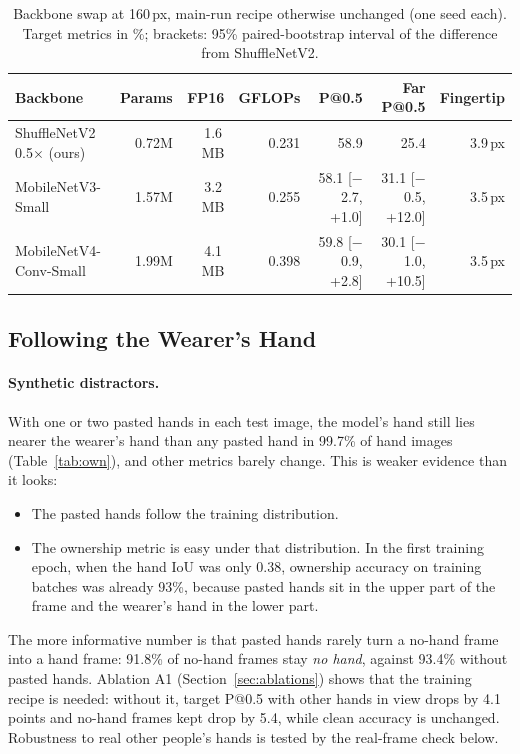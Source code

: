 \begin{table}[t]
  \caption{Backbone swap at 160\,px, main-run recipe otherwise unchanged (one seed each). Target metrics in \%; brackets: 95\% paired-bootstrap interval of the difference from ShuffleNetV2.}
  \label{tab:backbone}
  \footnotesize
  \setlength{\tabcolsep}{4pt}
  \begin{tabular}{lrrrrrr}
    \toprule
    Backbone & Params & FP16 & GFLOPs & P@0.5 & Far P@0.5 & Fingertip \\
    \midrule
    ShuffleNetV2 0.5$\times$ (ours) & 0.72M & 1.6\,MB & 0.231 & 58.9 & 25.4 & 3.9\,px \\
    MobileNetV3-Small & 1.57M & 3.2\,MB & 0.255 & 58.1 [$-$2.7, +1.0] & 31.1 [$-$0.5, +12.0] & 3.5\,px \\
    MobileNetV4-Conv-Small & 1.99M & 4.1\,MB & 0.398 & 59.8 [$-$0.9, +2.8] & 30.1 [$-$1.0, +10.5] & 3.5\,px \\
    \bottomrule
  \end{tabular}
\end{table}

\subsection{Following the Wearer's Hand}\label{sec:own}

\paragraph{Synthetic distractors.} With one or two pasted hands in each test image, the model's hand still lies nearer the wearer's hand than any pasted hand in 99.7\% of hand images (Table~\ref{tab:own}), and other metrics barely change. This is weaker evidence than it looks:
\begin{itemize}
\item The pasted hands follow the training distribution.
\item The ownership metric is easy under that distribution. In the first training epoch, when the hand IoU was only 0.38, ownership accuracy on training batches was already 93\%, because pasted hands sit in the upper part of the frame and the wearer's hand in the lower part.
\end{itemize}
The more informative number is that pasted hands rarely turn a no-hand frame into a hand frame: 91.8\% of no-hand frames stay \emph{no hand}, against 93.4\% without pasted hands. Ablation A1 (Section~\ref{sec:ablations}) shows that the training recipe is needed: without it, target P@0.5 with other hands in view drops by 4.1 points and no-hand frames kept drop by 5.4, while clean accuracy is unchanged. Robustness to real other people's hands is tested by the real-frame check below.

